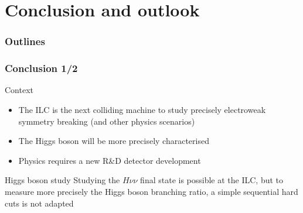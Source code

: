 \documentclass{beamer}
\begin{document}
    
\section{Conclusion and outlook} 
\begin{frame}
  \frametitle{Outlines}
  \begin{minipage}{\textwidth}
  \footnotesize
    \tableofcontents[currentsection,hideothersubsections, 
    sectionstyle=show/shaded]
  \end{minipage}
\end{frame}

\begin{frame}
  \frametitle{Conclusion 1/2}

  \begin{block}{Context}
    \begin{itemize}
      \item The ILC is the next colliding machine to study precisely electroweak symmetry breaking (and other physics scenarios)
      \item The Higgs boson will be more precisely characterised
      \item Physics  requires a new R\&D detector development 
    \end{itemize}
  \end{block}

  \begin{block}{Higgs boson study}
    Studying the $H\nu\nu$ final state is possible at the ILC, but to measure more precisely the Higgs boson branching ratio, a simple sequential hard cuts is not adapted
  \end{block}

  \vspace{-0.23cm}

\end{frame}
\end{document}
